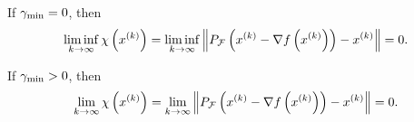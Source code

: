 \begin{theorem}
\label{the_convergence_theorem}



If $\gamma_{\textrm{min}} = 0$, then
\begin{align*}
\liminf_{k\to\infty} \chi\left(x^{(k)}\right) = \liminf_{k\to\infty} \left\|P_{{\mathcal F}}\left(x^{(k)} - \nabla f\left(x^{(k)}\right)\right) - x^{(k)} \right\| = 0.
\end{align*}

If $\gamma_{\textrm{min}} > 0$, then
\begin{align*}
\lim_{k\to\infty} \chi\left(x^{(k)}\right) = \lim_{k\to\infty} \left\|P_{{\mathcal F}}\left(x^{(k)} - \nabla f\left(x^{(k)}\right)\right) - x^{(k)} \right\| = 0.
\end{align*}

\end{theorem}




